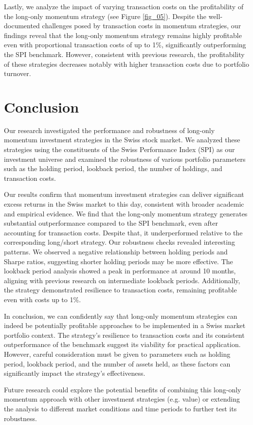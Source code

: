 \documentclass[a4paper,12pt]{article}
\begin{document}
Lastly, we analyze the impact of varying transaction costs on the profitability of the long-only momentum strategy (see Figure \ref{fig_05}). Despite the well-documented challenges posed by transaction costs in momentum strategies, our findings reveal that the long-only momentum strategy remains highly profitable even with proportional transaction costs of up to 1\%, significantly outperforming the SPI benchmark. However, consistent with previous research, the profitability of these strategies decreases notably with higher transaction costs due to portfolio turnover. 
\newpage

\section{Conclusion}
Our research investigated the performance and robustness of long-only momentum investment strategies in the Swiss stock market. We analyzed these strategies using the constituents of the Swiss Performance Index (SPI) as our investment universe and examined the robustness of various portfolio parameters such as the holding period, lookback period, the number of holdings, and transaction costs.

Our results confirm that momentum investment strategies can deliver significant excess returns in the Swiss market to this day, consistent with broader academic and empirical evidence. We find that the long-only momentum strategy generates substantial outperformance compared to the SPI benchmark, even after accounting for transaction costs. Despite that, it underperformed relative to the corresponding long/short strategy. Our robustness checks revealed interesting patterns. We observed a negative relationship between holding periods and Sharpe ratios, suggesting shorter holding periods may be more effective. The lookback period analysis showed a peak in performance at around 10 months, aligning with previous research on intermediate lookback periods. Additionally, the strategy demonstrated resilience to transaction costs, remaining profitable even with costs up to 1\%.

In conclusion, we can confidently say that long-only momentum strategies can indeed be  potentially profitable approaches to be implemented in a Swiss market portfolio context. The strategy's resilience to transaction costs and its consistent outperformance of the benchmark suggest its viability for practical application. However, careful consideration must be given to parameters such as holding period, lookback period, and the number of assets held, as these factors can significantly impact the strategy's effectiveness.

Future research could explore the potential benefits of combining this long-only momentum approach with other investment strategies (e.g. value) or extending the analysis to different market conditions and time periods to further test its robustness.

\newpage

\printbibliography
\end{document}
